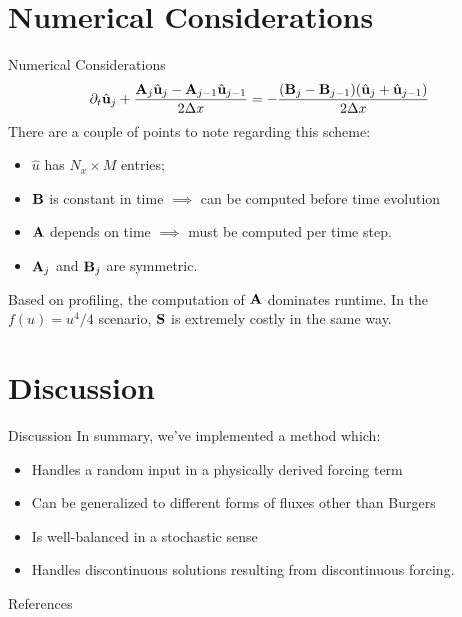 \documentclass[
    pdf,
    11pt,
    xcolor={svgnames},
  ]{beamer}
\begin{document}
\section{Numerical Considerations}
\begin{frame}{Numerical Considerations}
   \begin{equation*}
       \partial_t \hat{\vb{u}}_j + \frac{\vb{A}_j \hat{\vb{u}}_j - \vb{A}_{j-1} \hat{\vb{u}}_{j-1}}{2\Delta x} = -\frac{(\vb{B}_j - \vb{B}_{j-1})(\hat{\vb{u}}_j + \hat{\vb{u}}_{j-1})}{2\Delta x}
   \end{equation*} 
   There are a couple of points to note regarding this scheme:
   \begin{itemize}
       \item $\hat{u}$ has $N_x \times M$ entries;
       \item $\vb{B}$ is constant in time $\implies$ can be computed before time evolution
       \item $\vb{A}$ depends on time $\implies$ must be computed per time step.
       \item $\vb{A}_j$ and $\vb{B}_j$ are symmetric.
   \end{itemize}
   Based on profiling, the computation of $\vb{A}$ dominates runtime. In the $f(u) = u^4 / 4$ scenario, $\vb{S}$ is extremely costly in the same way.
\end{frame}

\section{Discussion}
\begin{frame}{Discussion}
   In summary, we've implemented a method which:
   \begin{itemize}
       \item Handles a random input in a physically derived forcing term
       \item Can be generalized to different forms of fluxes other than Burgers
       \item Is well-balanced in a stochastic sense
       \item Handles discontinuous solutions resulting from discontinuous forcing.
   \end{itemize}
\end{frame}

\begin{frame}{References}
\printbibliography
\end{frame}
\end{document}
